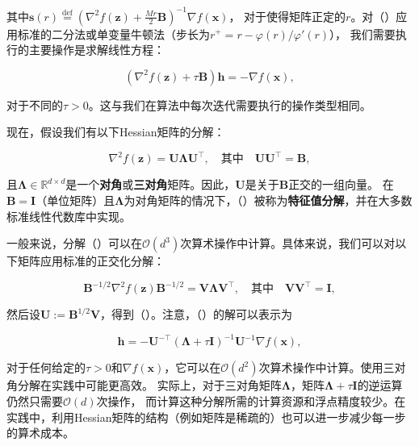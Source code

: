 \documentclass[a4paper,twoside,AutoFakeBold]{article}
\theoremstyle{definition}
\begin{document}
其中\(\mathbf{s}(r) \stackrel{\text{def}}{=} \left( \nabla^2 f(\mathbf{z}) + \frac{M r}{2} \mathbf{B} \right)^{-1} \nabla f(\mathbf{x})\)，
对于使得矩阵正定的\(r\)。对（）应用标准的二分法或单变量牛顿法（步长为\(r^+ = r - \varphi(r)/\varphi'(r)\)），
我们需要执行的主要操作是求解线性方程：

\begin{equation}\label{25}
\left( \nabla^2 f(\mathbf{z}) + \tau \mathbf{B} \right) \mathbf{h} = -\nabla f(\mathbf{x}), \tag{25}
\end{equation}

对于不同的\(\tau > 0\)。这与我们在算法中每次迭代需要执行的操作类型相同。

现在，假设我们有以下Hessian矩阵的分解：

\begin{equation}\label{26}
\nabla^2 f(\mathbf{z}) = \mathbf{U} \boldsymbol{\Lambda} \mathbf{U}^\top, \quad \text{其中} \quad \mathbf{U} \mathbf{U}^\top = \mathbf{B}, \tag{26}
\end{equation}

且\(\boldsymbol{\Lambda} \in \mathbb{R}^{d \times d}\)是一个\textbf{对角}或\textbf{三对角}矩阵。因此，\(\mathbf{U}\)是关于\(\mathbf{B}\)正交的一组向量。
在\(\mathbf{B} = \mathbf{I}\)（单位矩阵）且\(\boldsymbol{\Lambda}\)为对角矩阵的情况下，（）被称为\textbf{特征值分解}，并在大多数标准线性代数库中实现。

一般来说，分解（）可以在\(\mathcal{O}(d^3)\)次算术操作中计算。具体来说，我们可以对以下矩阵应用标准的正交化分解：

\[
\mathbf{B}^{-1/2} \nabla^2 f(\mathbf{z}) \mathbf{B}^{-1/2} = \mathbf{V} \boldsymbol{\Lambda} \mathbf{V}^\top, \quad \text{其中} \quad \mathbf{V} \mathbf{V}^\top = \mathbf{I},
\]

然后设\(\mathbf{U} := \mathbf{B}^{1/2} \mathbf{V}\)，得到（）。注意，（）的解可以表示为

\[
\mathbf{h} = -\mathbf{U}^{-\top} \left( \boldsymbol{\Lambda} + \tau \mathbf{I} \right)^{-1} \mathbf{U}^{-1} \nabla f(\mathbf{x}),
\]

对于任何给定的\(\tau > 0\)和\(\nabla f(\mathbf{x})\)，它可以在\(\mathcal{O}(d^2)\)次算术操作中计算。使用三对角分解在实践中可能更高效。
实际上，对于三对角矩阵\(\boldsymbol{\Lambda}\)，矩阵\(\boldsymbol{\Lambda} + \tau \mathbf{I}\)的逆运算仍然只需要\(\mathcal{O}(d)\)次操作，
而计算这种分解所需的计算资源和浮点精度较少。在实践中，利用Hessian矩阵的结构（例如矩阵是稀疏的）也可以进一步减少每一步的算术成本。
\end{document}
